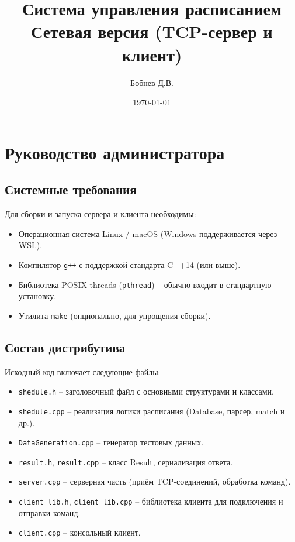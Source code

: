 \documentclass[12pt,a4paper]{article}
\title{Система управления расписанием\\[0.3em]
\large Сетевая версия (TCP-сервер и клиент)}
\author{Бобнев Д.В.}
\date{\today}
\begin{document}
\maketitle
\tableofcontents
\newpage

\section{Руководство администратора}
\label{sec:admin}

\subsection{Системные требования}
Для сборки и запуска сервера и клиента необходимы:
\begin{itemize}
  \item Операционная система Linux / macOS (Windows поддерживается через WSL).
  \item Компилятор \texttt{g++} с поддержкой стандарта C++14 (или выше).
  \item Библиотека POSIX threads (\texttt{pthread}) – обычно входит в стандартную установку.
  \item Утилита \texttt{make} (опционально, для упрощения сборки).
\end{itemize}

\subsection{Состав дистрибутива}
Исходный код включает следующие файлы:
\begin{itemize}
  \item \texttt{shedule.h} – заголовочный файл с основными структурами и классами.
  \item \texttt{shedule.cpp} – реализация логики расписания (Database, парсер, match и др.).
  \item \texttt{DataGeneration.cpp} – генератор тестовых данных.
  \item \texttt{result.h}, \texttt{result.cpp} – класс Result, сериализация ответа.
  \item \texttt{server.cpp} – серверная часть (приём TCP‑соединений, обработка команд).
  \item \texttt{client\_lib.h}, \texttt{client\_lib.cpp} – библиотека клиента для подключения и отправки команд.
  \item \texttt{client.cpp} – консольный клиент.
\end{itemize}
\end{document}
